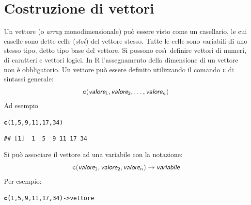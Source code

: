 \documentclass[onecolumn,11pt]{book}\usepackage[]{graphicx}\usepackage[]{color}
\makeatletter
\newcommand{\hlnum}[1]{\textcolor[rgb]{0.686,0.059,0.569}{#1}}%
\newcommand{\hlstd}[1]{\textcolor[rgb]{0.345,0.345,0.345}{#1}}%
\newcommand{\hlkwb}[1]{\textcolor[rgb]{0.69,0.353,0.396}{#1}}%
\newcommand{\hlkwd}[1]{\textcolor[rgb]{0.737,0.353,0.396}{\textbf{#1}}}%
\newenvironment{kframe}{%
 \def\at@end@of@kframe{}%
 \ifinner\ifhmode%
  \def\at@end@of@kframe{\end{minipage}}%
  \begin{minipage}{\columnwidth}%
 \fi\fi%
 \def\FrameCommand##1{\hskip\@totalleftmargin \hskip-\fboxsep
 \colorbox{shadecolor}{##1}\hskip-\fboxsep
     \hskip-\linewidth \hskip-\@totalleftmargin \hskip\columnwidth}%
 \MakeFramed {\advance\hsize-\width
   \@totalleftmargin\z@ \linewidth\hsize
   \@setminipage}}%
 {\par\unskip\endMakeFramed%
 \at@end@of@kframe}
\newenvironment{knitrout}{}{} %
\newcommand{\varia}[1]{\textsl{\textsf{#1}}}
\makeatother
\begin{document}
\section{Costruzione di vettori}  Un vettore (o \textit{array} monodimensionale)
pu\`o essere visto come un casellario, le cui caselle sono dette celle (\emph{slot}) del vettore stesso. Tutte le celle sono variabili di uno stesso tipo, detto tipo base del vettore. Si possono cos\`\i\  definire vettori di numeri, di caratteri e vettori logici.
In \textsf{R} l'assegnamento della dimensione di un vettore non \`e obbligatorio. %
Un vettore pu\`o  essere definito utilizzando il comando \texttt{c} di sintassi generale:
\begin{equation*}
\texttt{c}(\varia{valore}_1, \varia{valore}_2, \ldots,\varia{valore}_n)
\end{equation*}
Ad esempio
\begin{knitrout}
\color{fgcolor}\begin{kframe}
\begin{alltt}
 \hlkwd{c}\hlstd{(}\hlnum{1}\hlstd{,}\hlnum{5}\hlstd{,}\hlnum{9}\hlstd{,}\hlnum{11}\hlstd{,}\hlnum{17}\hlstd{,}\hlnum{34}\hlstd{)}
\end{alltt}
\begin{verbatim}
## [1]  1  5  9 11 17 34
\end{verbatim}
\end{kframe}
\end{knitrout}
Si pu\`o associare il vettore ad una variabile con la notazione:
\begin{equation*}
\texttt{c}(\varia{valore}_1, \varia{valore}_2, \varia{valore}_n)\rightarrow \varia{variabile}
\end{equation*}
Per esempio:
\begin{knitrout}
\color{fgcolor}\begin{kframe}
\begin{alltt}
\hlkwd{c}\hlstd{(}\hlnum{1}\hlstd{,}\hlnum{5}\hlstd{,}\hlnum{9}\hlstd{,}\hlnum{11}\hlstd{,}\hlnum{17}\hlstd{,}\hlnum{34}\hlstd{)}\hlkwb{->}\hlstd{vettore}
\end{alltt}
\end{kframe}
\end{knitrout}
\end{document}
